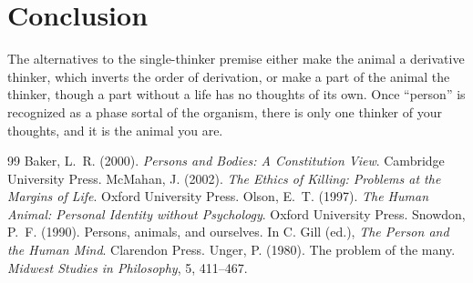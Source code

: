 \documentclass{situationist-preprint}
\begin{document}
\section{Conclusion}

The alternatives to the single-thinker premise either make the animal a derivative thinker, which inverts the order of derivation, or make a part of the animal the thinker, though a part without a life has no thoughts of its own. Once \enquote{person} is recognized as a phase sortal of the organism, there is only one thinker of your thoughts, and it is the animal you are.

\begin{thebibliography}{99}\small
{} Baker, L.~R. (2000). \emph{Persons and Bodies: A Constitution View}. Cambridge University Press.
 McMahan, J. (2002). \emph{The Ethics of Killing: Problems at the Margins of Life}. Oxford University Press.
 Olson, E.~T. (1997). \emph{The Human Animal: Personal Identity without Psychology}. Oxford University Press.
 Snowdon, P.~F. (1990). Persons, animals, and ourselves. In C. Gill (ed.), \emph{The Person and the Human Mind}. Clarendon Press.
 Unger, P. (1980). The problem of the many. \emph{Midwest Studies in Philosophy}, 5, 411--467.
\end{thebibliography}
\end{document}

